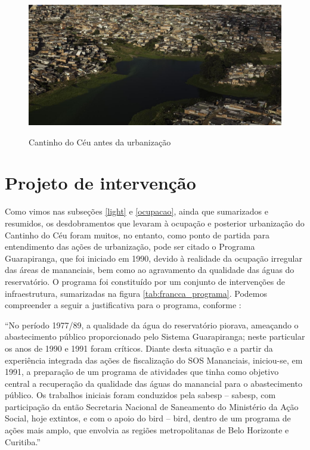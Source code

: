 	\begin{figure}[htb]
		\centering
		\caption{Cantinho do Céu antes da urbanização}
		\includegraphics[width=\linewidth]{img/knoll_antes03}
		\label{fig:fotos_antes_03}
	\end{figure}
	
	\chapter{Projeto de intervenção}
	
	Como vimos nas subseções \ref{light} e \ref{ocupacao}, ainda que sumarizados e resumidos, os desdobramentos que levaram à ocupação e posterior urbanização do Cantinho do Céu foram muitos, no entanto, como ponto de partida para entendimento das ações de urbanização, pode ser citado o Programa Guarapiranga, que foi iniciado em 1990, devido à realidade da ocupação irregular das áreas de mananciais, bem como ao agravamento da qualidade das águas do reservatório. O programa foi constituído por um conjunto de intervenções de infraestrutura, sumarizadas na figura \ref*{tab:francca_programa}. Podemos compreender a seguir a justificativa para o programa, conforme :
	
	\begin{citacao}
		``No período 1977/89, a qualidade da água do reservatório piorava, ameaçando o abastecimento público proporcionado pelo Sistema Guarapiranga; neste particular os anos de 1990 e 1991 foram críticos. Diante desta situação e a partir da experiência integrada das ações de fiscalização do SOS Mananciais, iniciou-se, em 1991, a preparação de um programa de atividades que tinha como objetivo central a recuperação da qualidade das águas do manancial para o abastecimento público. Os trabalhos iniciais foram conduzidos pela \gls{sabesp} -- \glsdesc{sabesp}, com participação da então Secretaria Nacional de Saneamento do Ministério da Ação Social, hoje extintos, e com o apoio do \glsdesc{bird} -- \gls{bird}, dentro de um programa de ações mais amplo, que envolvia as regiões metropolitanas de Belo Horizonte e Curitiba.''
	\end{citacao}
	
